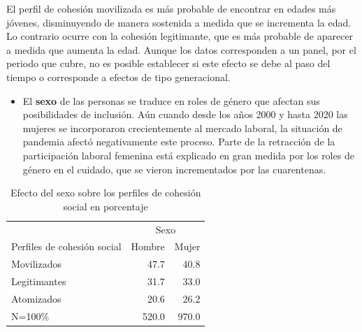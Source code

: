 \documentclass[
  12pt,
]{book}
\providecommand{\tightlist}{%
  \setlength{\itemsep}{0pt}\setlength{\parskip}{0pt}}
\begin{document}
\begin{table}

\caption{\label{tab:clases-edad}Efecto de la edad sobre los perfiles de cohesión social en porcentaje}
\centering
{}
\end{table}

El perfil de cohesión movilizada es más probable de encontrar en edades más jóvenes, disminuyendo de manera sostenida a medida que se incrementa la edad. Lo contrario ocurre con la cohesión legitimante, que es más probable de aparecer a medida que aumenta la edad. Aunque los datos corresponden a un panel, por el periodo que cubre, no es posible establecer si este efecto se debe al paso del tiempo o corresponde a efectos de tipo generacional.

\begin{itemize}
\tightlist
\item
  El \textbf{sexo} de las personas se traduce en roles de género que afectan sus posibilidades de inclusión. Aún cuando desde los años 2000 y hasta 2020 las mujeres se incorporaron crecientemente al mercado laboral, la situación de pandemia afectó negativamente este proceso. Parte de la retracción de la participación laboral femenina está explicado en gran medida por los roles de género en el cuidado, que se vieron incrementados por las cuarentenas.
\end{itemize}

\begin{table}

\caption{\label{tab:clases-sexo}Efecto del sexo sobre los perfiles de cohesión social en porcentaje}
\centering
\begin{tabular}[t]{l|r|r}
\hline
\multicolumn{1}{c|}{ } & \multicolumn{2}{c}{Sexo} \\
\cline{2-3}
Perfiles de cohesión social & Hombre & Mujer\\
\hline
Movilizados & 47.7 & 40.8\\
\hline
Legitimantes & 31.7 & 33.0\\
\hline
Atomizados & 20.6 & 26.2\\
\hline
N=100\% & 520.0 & 970.0\\
\hline
\end{tabular}
\end{table}
\end{document}
